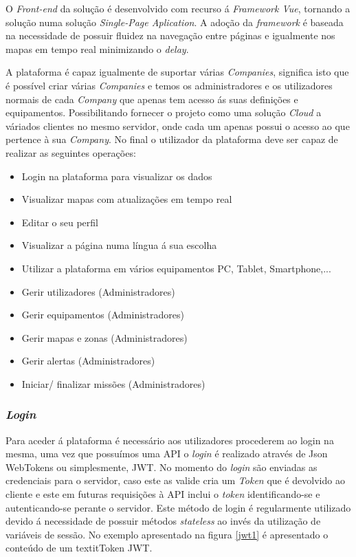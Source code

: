 \par O \textit{Front-end} da solução é desenvolvido com recurso á \textit{Framework Vue}, tornando a solução numa solução \textit{Single-Page Aplication}. A adoção da \textit{framework} é baseada na necessidade de possuir fluidez na navegação entre páginas e igualmente nos mapas em tempo real minimizando o \textit{delay}.
\par A plataforma é capaz igualmente de suportar várias \textit{Companies}, significa isto que é possível criar várias \textit{Companies} e temos os administradores e os utilizadores normais de cada \textit{Company} que apenas tem acesso ás suas definições e equipamentos. Possibilitando fornecer o projeto como uma solução \textit{Cloud} a váriados clientes no mesmo servidor, onde cada um apenas possui o acesso ao que pertence à sua \textit{Company}.
No final o utilizador da plataforma deve ser capaz de realizar as seguintes operações:
\par
\begin{itemize}
\item Login na plataforma para visualizar os dados
\item Visualizar mapas com atualizações em tempo real
\item Editar o seu perfil
\item Visualizar a página numa língua á sua escolha
\item Utilizar a plataforma em vários equipamentos PC, Tablet, Smartphone,...
\item Gerir utilizadores (Administradores)
\item Gerir equipamentos (Administradores)
\item Gerir mapas e zonas (Administradores)
\item Gerir alertas (Administradores)
\item Iniciar/ finalizar missões (Administradores)
\end{itemize}


\subsubsection{\textit{Login}}
\par Para aceder á plataforma é necessário aos utilizadores procederem ao login na mesma, uma vez que possuímos uma API o \textit{login} é realizado através de Json WebTokens ou simplesmente, JWT. No momento do \textit{login} são enviadas as credenciais para o servidor, caso este as valide cria um \textit{Token} que é devolvido ao cliente e este em futuras requisições à API inclui o \textit{token} identificando-se e autenticando-se perante o servidor. Este método de login é regularmente utilizado devido á necessidade de possuir métodos \textit{stateless} ao invés da utilização de variáveis de sessão. No exemplo apresentado na figura \ref{jwt1} é apresentado o conteúdo de um textit{Token} JWT. 


